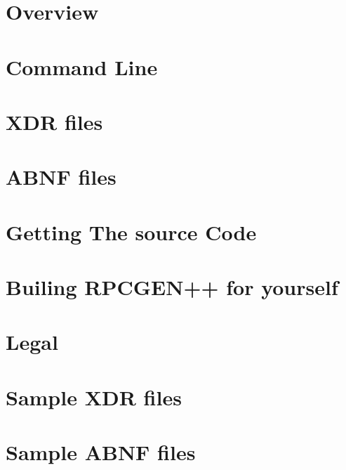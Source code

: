 \documentclass[2pt]{book}
\begin{document}
\mainmatter
\chapter{Overview}



\chapter{Command Line}

\chapter{XDR files}










\chapter{ABNF files}
\chapter{Getting The source Code}

\chapter{Builing RPCGEN++ for yourself}


\chapter{Legal}

\appendix
\chapter{Sample XDR files}
\chapter{Sample ABNF files}
\end{document}
